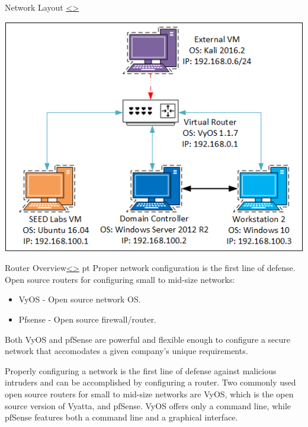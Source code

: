 \documentclass[12pt]{article}
\newenvironment{instructionblock}{\Large\bgroup}{\egroup}
\begin{document}
\pagebreak
\begin{slide}{Network Layout}{ \hyperref[slide 2]{\textless}\hyperref[slide 4]{\textgreater} }
	\vskip 5pt
	\begin{instructionblock}
		\begin{center}
			\includegraphics{NetworkDiagram.png}
		\end{center}
	\end{instructionblock}
\end{slide}





\pagebreak
{}
\setcounter{section}{1}
\begin{slide}{Router Overview}{\hyperref[slide 3]{\textless}\hyperref[slide 5]{\textgreater}}
	 pt
	\begin{instructionblock}
    Proper network configuration is the first line of defense.\\
    Open source routers for configuring small to mid-size networks:
    \begin{itemize}
    \item VyOS - Open source network OS.
    \item Pfsense - Open source firewall/router.
    \end{itemize}
    Both VyOS and pfSense are powerful and flexible enough to configure a secure network that accomodates a given company's unique requirements. 

	\end{instructionblock}
\end{slide}
\par Properly configuring a network is the first line of defense against malicious intruders and can be accomplished by configuring a router. Two commonly used open source routers for small to mid-size networks are VyOS, which is the open source version of Vyatta, and pfSense. VyOS offers only a command line, while pfSense features both a command line and a graphical interface. 
\end{document}
